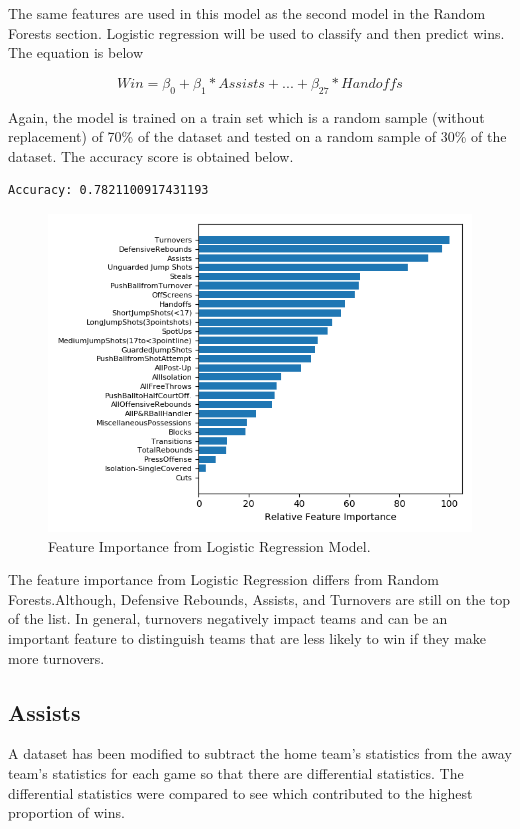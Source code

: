 \documentclass[]{book}
\begin{document}
The same features are used in this model as the second model in the Random Forests section. Logistic regression will be used to classify and then predict wins. The equation is below

\[ Win = \beta_0 + {\beta_1*Assists} + ... + {\beta_{27}*Handoffs} \]

Again, the model is trained on a train set which is a random sample (without replacement) of 70\% of the dataset and tested on a random sample of 30\% of the dataset. The accuracy score is obtained below.

\begin{verbatim}
Accuracy: 0.7821100917431193
\end{verbatim}

\begin{figure}
\centering
\includegraphics{images/Feat_imp.png}
\caption{Feature Importance from Logistic Regression Model.}
\end{figure}

The feature importance from Logistic Regression differs from Random Forests.Although, Defensive Rebounds, Assists, and Turnovers are still on the top of the list. In general, turnovers negatively impact teams and can be an important feature to distinguish teams that are less likely to win if they make more turnovers.

\hypertarget{assists}{%
\subsection{Assists}\label{assists}}

A dataset has been modified to subtract the home team's statistics from the away team's statistics for each game so that there are differential statistics.
The differential statistics were compared to see which contributed to the highest proportion of wins.
\end{document}
